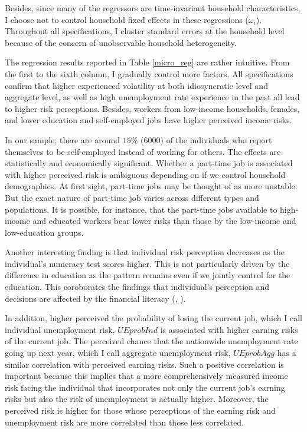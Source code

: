 \documentclass[12pt,notitlepage,onecolumn,aps,pra]{article}
\begin{document}
Besides, since many of the regressors are time-invariant household
characteristics, I choose not to control household fixed effects in
these regressions (\(\omega_i\)). Throughout all specifications, I
cluster standard errors at the household level because of the concern of
unobservable household heterogeneity.

The regression results reported in Table \ref{micro_reg} are rather
intuitive. From the first to the sixth column, I gradually control more
factors. All specifications confirm that higher experienced volatility
at both idiosyncratic level and aggregate level, as well as high
unemployment rate experience in the past all lead to higher risk
perceptions. Besides, workers from low-income households, females, and
lower education and self-employed jobs have higher perceived income
risks.

In our sample, there are around \(15\%\) (6000) of the individuals who
report themselves to be self-employed instead of working for others. The
effects are statistically and economically significant. Whether a
part-time job is associated with higher perceived risk is ambiguous
depending on if we control household demographics. At first sight,
part-time jobs may be thought of as more unstable. But the exact nature
of part-time job varies across different types and populations. It is
possible, for instance, that the part-time jobs available to high-income
and educated workers bear lower risks than those by the low-income and
low-education groups.

Another interesting finding is that individual risk perception decreases
as the individual's numeracy test scores higher. This is not
particularly driven by the difference in education as the pattern
remains even if we jointly control for the education. This coroborates
the findings that individual's perception and decisions are affected by
the financial literacy (\cite{van2011financial},
\cite{lusardi2014economic}).

In addition, higher perceived the probability of losing the current job,
which I call individual unemployment risk, \(\textit{UEprobInd}\) is
associated with higher earning risks of the current job. The perceived
chance that the nationwide unemployment rate going up next year, which I
call aggregate unemployment risk, \(\textit{UEprobAgg}\) has a similar
correlation with perceived earning risks. Such a positive correlation is
important because this implies that a more comprehensively measured
income risk facing the individual that incorporates not only the current
job's earning risks but also the risk of unemployment is actually
higher. Moreover, the perceived risk is higher for those whose
perceptions of the earning risk and unemployment risk are more
correlated than those less correlated.
\end{document}
